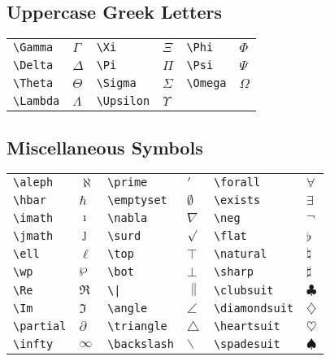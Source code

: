 \subsection{Uppercase Greek Letters}
\begin{table}[H]
    \centering 
    \begin{tabular}{lp{2cm}lp{2cm}lp{2cm}}
	\verb|\Gamma|	& $\Gamma$  &
	\verb|\Xi|	& $\Xi$  &
	\verb|\Phi|	& $\Phi$    \\
	\verb|\Delta|	& $\Delta$  &
	\verb|\Pi|	& $\Pi$  &
	\verb|\Psi|	& $\Psi$    \\
	\verb|\Theta|	& $\Theta$  &
	\verb|\Sigma|	& $\Sigma$  &
	\verb|\Omega|	& $\Omega$	\\
	\verb|\Lambda|	& $\Lambda$  &
	\verb|\Upsilon|	& $\Upsilon$  &
	&   \\
    \end{tabular}
\end{table}

\subsection{Miscellaneous Symbols}
\begin{table}[!htbp]
    \centering
    \begin{tabular}{lp{2cm}lp{2cm}lp{2cm}}
	\verb|\aleph|	& $\aleph$	&
	\verb|\prime|	& $\prime$	&
	\verb|\forall|	& $\forall$	    \\
	\verb|\hbar|	& $\hbar$	& 
	\verb|\emptyset|	& $\emptyset$	& 
	\verb|\exists|	& $\exists$	    \\ 
	\verb|\imath|	& $\imath$	& 
	\verb|\nabla|	& $\nabla$	&   
	\verb|\neg|	& $\neg$	    \\ 
	\verb|\jmath|	& $\jmath$	& 
	\verb|\surd|	& $\surd$	& 
	\verb|\flat|	& $\flat$	    \\ 
	\verb|\ell|	& $\ell$	& 
	\verb|\top|	& $\top$	& 
	\verb|\natural|	& $\natural$	    \\ 
	\verb|\wp|	& $\wp$	& 
	\verb|\bot|	& $\bot$	& 
	\verb|\sharp|	& $\sharp$	    \\ 
	\verb|\Re|	& $\Re$	& 
	\verb/\|/	& $\|$	& 
	\verb|\clubsuit|	& $\clubsuit$	    \\
	\verb|\Im|	& $\Im$	& 
	\verb|\angle|	& $\angle$	& 
	\verb|\diamondsuit|	& $\diamondsuit$    \\
	\verb|\partial|	& $\partial$	& 
	\verb|\triangle|	& $\triangle$	& 
	\verb|\heartsuit|	& $\heartsuit$	\\
	\verb|\infty|	& $\infty$	& 
	\verb|\backslash|	& $\backslash$	& 
	\verb|\spadesuit|	& $\spadesuit$	\\
    \end{tabular}
\end{table}
	
